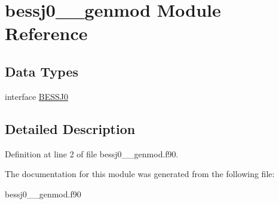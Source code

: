 \hypertarget{classbessj0____genmod}{\section{bessj0\+\_\+\+\_\+genmod Module Reference}
\label{classbessj0____genmod}
}
\subsection*{Data Types}
\begin{DoxyCompactItemize}
\item 
interface \hyperlink{interfacebessj0____genmod_1_1_b_e_s_s_j0}{B\+E\+S\+S\+J0}
\end{DoxyCompactItemize}


\subsection{Detailed Description}


Definition at line 2 of file bessj0\+\_\+\+\_\+genmod.\+f90.



The documentation for this module was generated from the following file\+:\begin{DoxyCompactItemize}
\item 
bessj0\+\_\+\+\_\+genmod.\+f90\end{DoxyCompactItemize}

